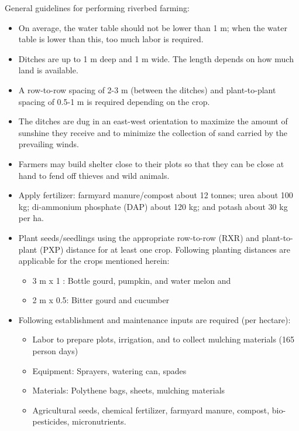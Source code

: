 \documentclass[
  openany]{book}
\providecommand{\tightlist}{%
  \setlength{\itemsep}{0pt}\setlength{\parskip}{0pt}}
\begin{document}
General guidelines for performing riverbed farming:

\begin{itemize}
\item
  On average, the water table should not be lower than 1 m; when the water table is lower than this, too much labor is required.
\item
  Ditches are up to 1 m deep and 1 m wide. The length depends on how much land is available.
\item
  A row-to-row spacing of 2-3 m (between the ditches) and plant-to-plant spacing of 0.5-1 m is required depending on the crop.
\item
  The ditches are dug in an east-west orientation to maximize the amount of sunshine they receive and to minimize the collection of sand carried by the prevailing winds.
\item
  Farmers may build shelter close to their plots so that they can be close at hand to fend off thieves and wild animals.
\item
  Apply fertilizer: farmyard manure/compost about 12 tonnes; urea about 100 kg; di-ammonium phosphate (DAP) about 120 kg; and potash about 30 kg per ha.
\item
  Plant seeds/seedlings using the appropriate row-to-row (RXR) and plant-to-plant (PXP) distance for at least one crop. Following planting distances are applicable for the crops mentioned herein:

  \begin{itemize}
  \tightlist
  \item
    3 m x 1 : Bottle gourd, pumpkin, and water melon and
  \item
    2 m x 0.5: Bitter gourd and cucumber
  \end{itemize}
\item
  Following establishment and maintenance inputs are required (per hectare):

  \begin{itemize}
  \tightlist
  \item
    Labor to prepare plots, irrigation, and to collect mulching materials (165 person days)
  \item
    Equipment: Sprayers, watering can, spades
  \item
    Materials: Polythene bags, sheets, mulching materials
  \item
    Agricultural seeds, chemical fertilizer, farmyard manure, compost, bio-pesticides, micronutrients.
  \end{itemize}
\end{itemize}
\end{document}
